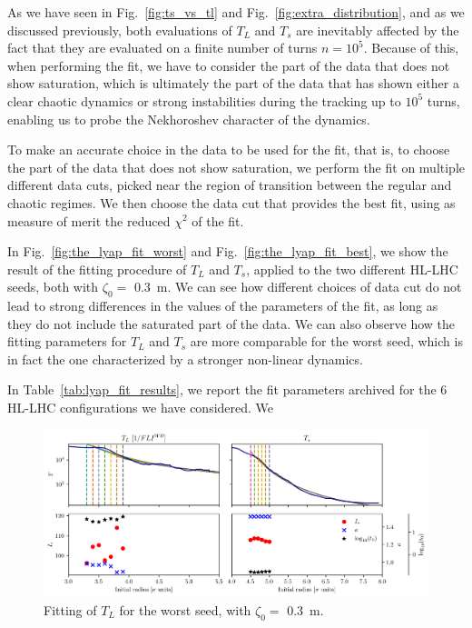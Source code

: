 As we have seen in Fig.~\ref{fig:ts_vs_tl} and Fig.~\ref{fig:extra_distribution}, and as we discussed previously, both evaluations of $T_L$ and $T_s$ are inevitably affected by the fact that they are evaluated on a finite number of turns $n=10^5$. Because of this, when performing the fit, we have to consider the part of the data that does not show saturation, which is ultimately the part of the data that has shown either a clear chaotic dynamics or strong instabilities during the tracking up to $10^5$ turns, enabling us to probe the Nekhoroshev character of the dynamics.

To make an accurate choice in the data to be used for the fit, that is, to choose the part of the data that does not show saturation, we perform the fit on multiple different data cuts, picked near the region of transition between the regular and chaotic regimes. We then choose the data cut that provides the best fit, using as measure of merit the reduced $\chi^2$ of the fit.

In Fig.~\ref{fig:the_lyap_fit_worst} and Fig.~\ref{fig:the_lyap_fit_best}, we show the result of the fitting procedure of $T_L$ and $T_s$, applied to the two different HL-LHC seeds, both with $\zeta_0=$ \SI{0.3}{\meter}. We can see how different choices of data cut do not lead to strong differences in the values of the parameters of the fit, as long as they do not include the saturated part of the data. We can also observe how the fitting parameters for $T_L$ and $T_s$ are more comparable for the worst seed, which is in fact the one characterized by a stronger non-linear dynamics.

In Table~\ref{tab:lyap_fit_results}, we report the fit parameters archived for the 6 HL-LHC configurations we have considered. We

\begin{figure}
    \centering
    \includegraphics[width=1\textwidth]{6_lhc_dynamic_indicators/figs/fit_l_time_bad.png}
    \caption{Fitting of $T_L$ for the worst seed, with $\zeta_0=$ \SI{0.3}{\meter}.}
\end{figure}

